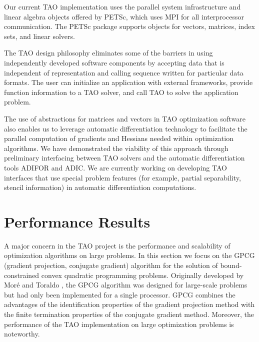 Our current TAO implementation uses the parallel system
infrastructure and linear algebra objects offered by PETSc,
which uses MPI \cite{using-mpi} for all interprocessor communication.
The PETSc package supports objects for vectors, matrices, index 
sets, and linear solvers.

The TAO design philosophy eliminates some of the barriers in using
independently developed software components by accepting data that is
independent of representation and calling sequence written for
particular data formats.  The user can initialize an application with
external frameworks, provide function information to a TAO solver, and
call TAO to solve the application problem.

The use of abstractions for matrices and vectors in TAO optimization
software also enables us to leverage automatic differentiation
technology to facilitate the parallel computation of gradients and
Hessians needed within optimization algorithms.  We have demonstrated
the viability of this approach through preliminary interfacing between
TAO solvers and the automatic differentiation tools ADIFOR and ADIC.
We are currently working on developing TAO interfaces that use special
problem features (for example, partial separability, stencil
information) in automatic differentiation computations.

\section{Performance Results}

A major concern in the TAO project is the performance and scalability
of optimization algorithms on large problems.  In this section we
focus on the GPCG (gradient projection, conjugate gradient) algorithm
for the solution of bound-constrained convex quadratic programming
problems.  Originally developed by Mor\'e and Toraldo
\cite{more-toraldo}, the GPCG algorithm was designed for large-scale
problems but had only been implemented for a single processor.  GPCG
combines the advantages of the identification properties of the
gradient projection method with the finite termination properties of
the conjugate gradient method.  Moreover, the performance of the
TAO implementation on large optimization problems is noteworthy.


